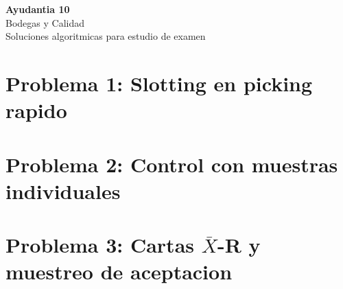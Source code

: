 \documentclass[11pt, a4paper]{article}
\begin{document}
\begin{center}
{\Huge\bfseries\color{gopcyan} Ayudantia 10}\\
{\Large Bodegas y Calidad}\\
\vspace{0.2cm}
{\small Soluciones algoritmicas para estudio de examen}
\end{center}

\tableofcontents
\newpage

\section{Problema 1: Slotting en picking rapido}

\section{Problema 2: Control con muestras individuales}

\section{Problema 3: Cartas \texorpdfstring{$\bar X$}{X-barra}-R y muestreo de aceptacion}
\end{document}
